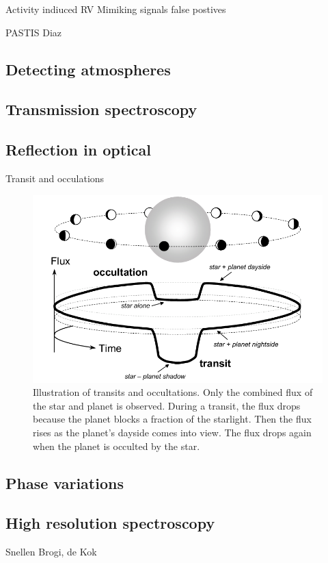 Activity indiuced RV
Mimiking signals false postives

PASTIS Diaz



\subsection{Detecting atmospheres}

\subsection{Transmission spectroscopy}

\subsection{Reflection in optical}

Transit and occulations~\citet{winn_transits_2010}


\begin{figure}
    \centering
    \includegraphics[width=0.6\linewidth]{./figures/introduction/circular_diagram.png}
    \caption{Illustration of transits and occultations. Only the combined flux of the star and planet is observed. During a transit, the flux
        drops because the planet blocks a fraction of the starlight. Then the flux rises as the planet’s dayside comes into view. The flux drops
        again when the planet is occulted by the star.~\citet{winn_transits_2010}}
    \label{fig:transits_and_occultations}
\end{figure}

\subsection{Phase variations}

\subsection{High resolution spectroscopy}
Snellen  Brogi, de Kok


